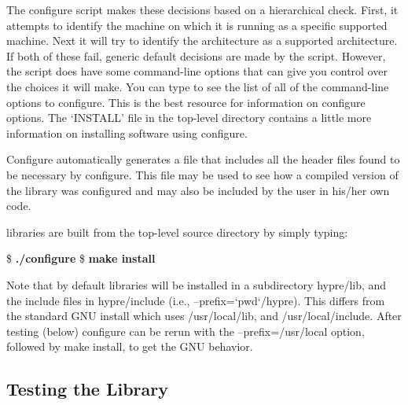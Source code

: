 The configure script makes these decisions based on a hierarchical
check.  First, it attempts to identify the machine on which it is
running as a specific supported machine.  Next it will try to identify
the architecture as a supported architecture.  If both of these fail,
generic default decisions are made by the script.  However, the script
does have some command-line options that can give you control over the
choices it will make.  You can type  to see the
list of all of the command-line options to configure. This is the best
resource for information on configure options.  The `INSTALL' file
in the top-level directory contains a little more information on
installing software using configure. 

Configure automatically generates a file  that
includes all the header files found to be necessary by configure.
This file may be used to see how a compiled version of the library was
configured and may also be included by the user in his/her own code.

\hypre{} libraries are built from the top-level source directory 
by simply typing:
\begin{ttfamily}
\begin{mdseries}
\linebreak
\$ \textbf{./configure}\linebreak
\$ \textbf{make install}\linebreak
\linebreak
\end{mdseries}
\end{ttfamily}
Note that by default \hypre{} libraries will be
installed in a subdirectory hypre/lib, and the include files in
hypre/include (i.e., --prefix=`pwd`/hypre). This differs from the standard
GNU install which uses /usr/local/lib, and /usr/local/include. After
testing (below) configure can be rerun with the --prefix=/usr/local
option, followed by make install, to get the GNU behavior.

\subsection{Testing the Library} 

